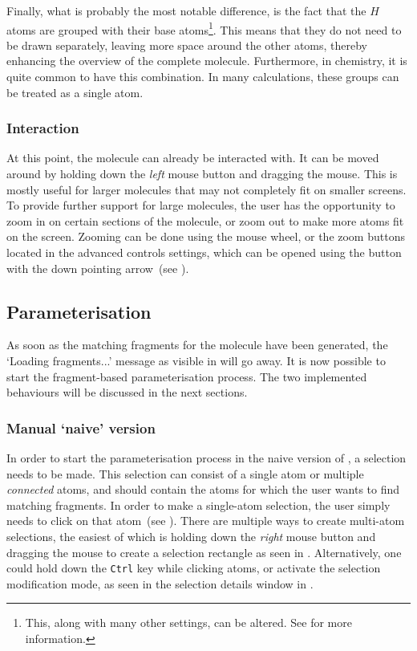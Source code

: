 Finally, what is probably the most notable difference, is the fact that the $H$ atoms are grouped with their base atoms\footnote{This, along with many other settings, can be altered. See  for more information.}. This means that they do not need to be drawn separately, leaving more space around the other atoms, thereby enhancing the overview of the complete molecule. Furthermore, in chemistry, it is quite common to have this combination. In many calculations, these groups can be treated as a single atom.

\subsubsection{Interaction}
At this point, the molecule can already be interacted with. It can be moved around by holding down the \emph{left} mouse button and dragging the mouse. This is mostly useful for larger molecules that may not completely fit on smaller screens. To provide further support for large molecules, the user has the opportunity to zoom in on certain sections of the molecule, or zoom out to make more atoms fit on the screen. Zooming can be done using the mouse wheel, or the zoom buttons located in the advanced controls settings, which can be opened using the button with the down pointing arrow~(see ).


\subsection{Parameterisation}
As soon as the matching fragments for the molecule have been generated, the `Loading fragments...' message as visible in  will go away. It is now possible to start the fragment-based parameterisation process. The two implemented behaviours will be discussed in the next sections.

\subsubsection{Manual `naive' version}
In order to start the parameterisation process in the naive version of \oframp, a selection needs to be made. This selection can consist of a single atom or multiple \emph{connected} atoms, and should contain the atoms for which the user wants to find matching fragments. In order to make a single-atom selection, the user simply needs to click on that atom~(see ). There are multiple ways to create multi-atom selections, the easiest of which is holding down the \emph{right} mouse button and dragging the mouse to create a selection rectangle as seen in . Alternatively, one could hold down the \verb|Ctrl| key while clicking atoms, or activate the selection modification mode, as seen in the selection details window in .


